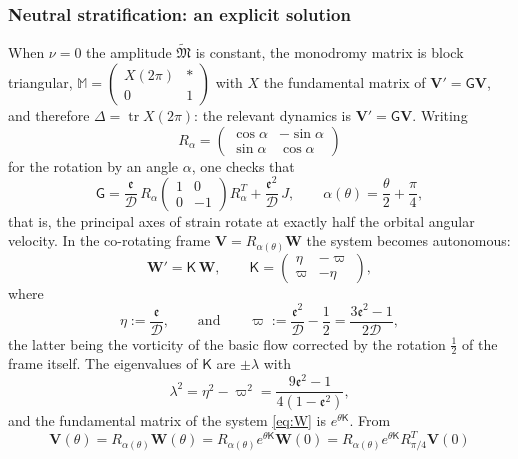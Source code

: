 \documentclass[reqno]{amsart}
\newcommand{\Msf}{\mathsf{G}}
\newcommand{\B}{{\mathfrak{M}}}
\newcommand{\D}{\mathcal{D}}
\newcommand{\ee}{\mathfrak{e}}
\newcommand{\tr}{\operatorname{tr}}     %
\begin{document}
\subsubsection{Neutral stratification: an explicit solution}\label{sec_neutral}
When $\nu=0$ the amplitude $\widetilde{\B}$ is constant, the monodromy matrix is block triangular, $\mathbb M=\left(\begin{smallmatrix}X(2\pi)&*\\0&1\end{smallmatrix}\right)$ with $X$ the fundamental matrix of $\mathbf V'=\Msf\mathbf V$, and therefore $\Delta=\tr X(2\pi)$: the relevant dynamics is $\mathbf V'=\Msf\mathbf V$. Writing
\[
R_\alpha=\begin{pmatrix}
    \cos\alpha & -\sin\alpha\\
    \sin\alpha &\cos\alpha
\end{pmatrix}
\]
for the rotation by an angle $\alpha$, one checks that
\[
\Msf=\frac{\ee}{\D}\,R_{\alpha}\begin{pmatrix}1&0\\0&-1\end{pmatrix}R_{\alpha}^T+\frac{\ee^2}{\D}\,J,\qquad \alpha(\theta)=\frac{\theta}{2}+\frac{\pi}{4},
\]
that is, the principal axes of strain rotate at exactly half the orbital angular velocity. In the co-rotating frame $\mathbf V=R_{\alpha(\theta)}\mathbf W$ the system becomes autonomous:
\begin{equation}\label{eq:W}
\mathbf W'=\mathsf K\,\mathbf W,\qquad
\mathsf K=\begin{pmatrix}\eta&-\varpi\\ \varpi&-\eta\end{pmatrix},
\end{equation}
where
\begin{equation}\label{eq:gsome}
\eta:=\frac{\ee}{\D},\qquad\text{and}\qquad
\varpi:=\frac{\ee^{2}}{\D}-\frac12=\frac{3\ee^{2}-1}{2\D},
\end{equation}
the latter being the vorticity of the basic flow corrected by the rotation $\frac{1}{2}$ of the frame itself. The eigenvalues of $\mathsf K$ are $\pm\lambda$ with
\begin{equation}\label{eq:lambda}
\lambda^2=\eta^2-\varpi^2=\frac{9\ee^2-1}{4(1-\ee^2)},
\end{equation}
and the fundamental matrix of the system \eqref{eq:W} is $e^{\theta\mathsf K}$. From 
\begin{equation}
    \mathbf V(\theta)=R_{\alpha(\theta)}\mathbf W(\theta)=R_{\alpha(\theta)}e^{\theta\mathsf K}\mathbf W(0) =R_{\alpha(\theta)}e^{\theta\mathsf K}R_{\pi/4}^T \mathbf V(0)
\end{equation}
\end{document}

